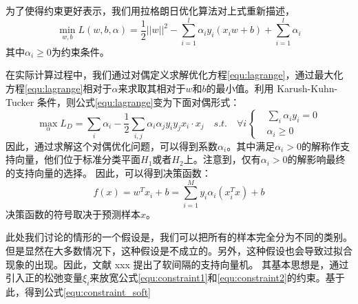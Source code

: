 为了使得约束更好表示，我们用拉格朗日优化算法对上式重新描述，
\begin{equation}
	\min \limits_{w,b} L(w,b,\alpha)=\frac{1}{2}||w||^2-\sum_{i=1}^l\alpha_i y_i (x_i w + b) + \sum_{i=1}^l{\alpha_i}
	\label{equ:lagrange}
\end{equation}
其中$\alpha_i \geq 0$为约束条件。

在实际计算过程中，我们通过对偶定义求解优化方程\ref{equ:lagrange}，通过最大化方程\ref{equ:lagrange}相对于$\alpha$来求取其相对于$w$和$b$的最小值。利用 Karush-Kuhn-Tucker 条件，则公式\ref{equ:lagrange}变为下面对偶形式：
\begin{equation}
	\max \limits_{\alpha} L_D=\sum_i{\alpha_i}-\frac{1}{2}\sum_{i,j}\alpha_i\alpha_jy_iy_jx_i\cdot x_j \quad s.t. \quad \forall i 
	\left\{
		\begin{aligned}
	   &\sum_i{\alpha_iy_i}=0  \\
	   &\alpha_i \geq 0
	   \end{aligned}
		\right.
\end{equation}
因此，通过求解这个对偶优化问题，可以得到系数$\alpha_i$。其中满足$\alpha_i>0$的解称作支持向量，他们位于标准分类平面$H_1$或者$H_2$上。注意到，仅有$\alpha_i>0$的解影响最终的支持向量的选择。
因此，可以得到决策函数：
\begin{equation}
	f(x)=w^Tx_i+b=\sum_{i=1}^My_i\alpha_i(x_i^Tx)+b
\end{equation}
决策函数的符号取决于预测样本$x$。

此处我们讨论的情形的一个假设是，我们可以把所有的样本完全分为不同的类别。但是显然在大多数情况下，这种假设是不成立的。另外，这种假设也会导致过拟合现象的出现。因此，文献 xxx 提出了软间隔的支持向量机。
其基本思想是，通过引入正的松弛变量$\xi_i$来放宽公式\ref{equ:constraint1}和\ref{equ:constraint2}的约束。基于此，得到公式\ref{equ:constraint_soft}

